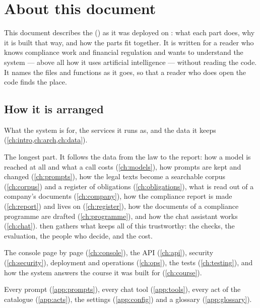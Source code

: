 \chapter*{About this document}

This document describes the \product{} (\lt{\productlt}) as it was deployed on \docdate: what
each part does, why it is built that way, and how the parts fit together. It is written for a
reader who knows compliance work and financial regulation and wants to understand the system
--- above all how it uses artificial intelligence --- without reading the code. It names the
files and functions as it goes, so that a reader who does open the code finds the place.

\section*{How it is arranged}

\begin{description}[style=nextline]
  \item[Part I --- The system at a glance] What the system is for, the services it runs as,
    and the data it keeps (\cref{ch:intro,ch:arch,ch:data}).
  \item[Part II --- Artificial intelligence in the system] The longest part. It follows the
    data from the law to the report: how a model is reached at all and what a call costs
    (\cref{ch:models}), how prompts are kept and changed (\cref{ch:prompts}), how the legal
    texts become a searchable corpus (\cref{ch:corpus}) and a register of obligations
    (\cref{ch:obligations}), what is read out of a company's documents (\cref{ch:company}),
    how the compliance report is made (\cref{ch:report}) and lives on (\cref{ch:register}),
    how the documents of a compliance programme are drafted (\cref{ch:programme}), and how the
    chat assistant works (\cref{ch:chat}).  then gathers what keeps all of
    this trustworthy: the checks, the evaluation, the people who decide, and the cost.
  \item[Part III --- Using and running the system] The console page by page
    (\cref{ch:console}), the API (\cref{ch:api}), security (\cref{ch:security}), deployment
    and operations (\cref{ch:ops}), the tests (\cref{ch:testing}), and how the system answers
    the course it was built for (\cref{ch:course}).
  \item[Reference] Every prompt (\cref{app:prompts}), every chat tool (\cref{app:tools}),
    every act of the catalogue (\cref{app:acts}), the settings (\cref{app:config}) and a
    glossary (\cref{app:glossary}).
\end{description}

